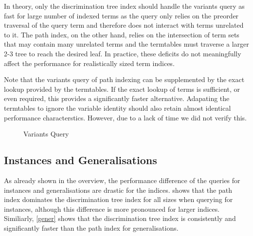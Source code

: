 In theory, only the discrimination tree index should handle the variants query as fast for large number of indexed terms as the query only relies on the preorder traversal of the query term and therefore does not interact with terms unrelated to it.
The path index, on the other hand, relies on the intersection of term sets that may contain many unrelated terms and the termtables must traverse a larger 2-3 tree to reach the desired leaf. In practice, these deficits do not meaningfully affect the performance for realistically sized term indices.

Note that the variants query of path indexing can be supplemented by the exact lookup provided by the termtables. If the exact lookup of terms is sufficient, or even required, this provides a significantly faster alternative. Adapating the termtables to ignore the variable identity should also retain almost identical performance characterstics. However, due to a lack of time we did not verify this.

\begin{figure}[h]
  \centering
{}
\caption{Variants Query}
\label{variants}
\end{figure}

\subsection{Instances and Generalisations}
As already shown in the overview, the performance difference of the queries for instances and generalisations are drastic for the indices.  shows that the path index dominates the discrimination tree index for all sizes when querying for instances, although this difference is more pronounced for larger indices. Similiarly, \cref{gener} shows that the discrimination tree index is consistently and significantly faster than the path index for generalisations.

